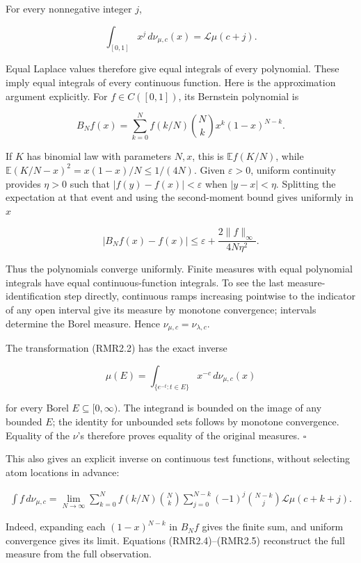 For every nonnegative integer \(j\),

\[
\int_{[0,1]}x^j\,d\nu_{\mu,c}(x)=\mathcal L\mu(c+j).
\tag{RMR2.3}
\]

Equal Laplace values therefore give equal integrals of every polynomial.
These imply equal integrals of every continuous function. Here is the
approximation argument explicitly. For \(f\in C([0,1])\), its Bernstein
polynomial is

\[
B_Nf(x)=\sum_{k=0}^N f(k/N)\binom Nk x^k(1-x)^{N-k}.
\]

If \(K\) has binomial law with parameters \(N,x\), this is
\(\mathbb E f(K/N)\), while \(\mathbb E(K/N-x)^2=x(1-x)/N\le1/(4N)\).
Given \(\varepsilon>0\), uniform continuity provides \(\eta>0\) such
that \(|f(y)-f(x)|<\varepsilon\) when \(|y-x|<\eta\). Splitting the
expectation at that event and using the second-moment bound gives
uniformly in \(x\)

\[
|B_Nf(x)-f(x)|
\le\varepsilon+\frac{2\|f\|_\infty}{4N\eta^2}.
\]

Thus the polynomials converge uniformly. Finite measures with equal
polynomial integrals have equal continuous-function integrals. To see
the last measure-identification step directly, continuous ramps
increasing pointwise to the indicator of any open interval give its
measure by monotone convergence; intervals determine the Borel measure.
Hence \(\nu_{\mu,c}=\nu_{\lambda,c}\).

The transformation (RMR2.2) has the exact inverse

\[
\mu(E)=\int_{\{e^{-t}:t\in E\}}x^{-c}\,d\nu_{\mu,c}(x)
\tag{RMR2.4}
\]

for every Borel \(E\subseteq[0,\infty)\). The integrand is bounded on
the image of any bounded \(E\); the identity for unbounded sets follows
by monotone convergence. Equality of the \(\nu\)'s therefore proves
equality of the original measures. \(\square\)

This also gives an explicit inverse on continuous test functions,
without selecting atom locations in advance:

\[
\begin{aligned}
\int f\,d\nu_{\mu,c}
=\lim_{N\to\infty}\sum_{k=0}^N f(k/N)\binom Nk
\sum_{j=0}^{N-k}(-1)^j\binom{N-k}{j}
\mathcal L\mu(c+k+j).
\end{aligned}
\tag{RMR2.5}
\]

Indeed, expanding each \((1-x)^{N-k}\) in \(B_Nf\) gives the finite sum,
and uniform convergence gives its limit. Equations (RMR2.4)--(RMR2.5)
reconstruct the full measure from the full observation.

